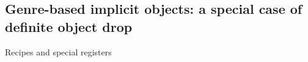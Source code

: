 
\subsection{Genre-based implicit objects: a special case of definite object drop} 

Recipes and special registers






